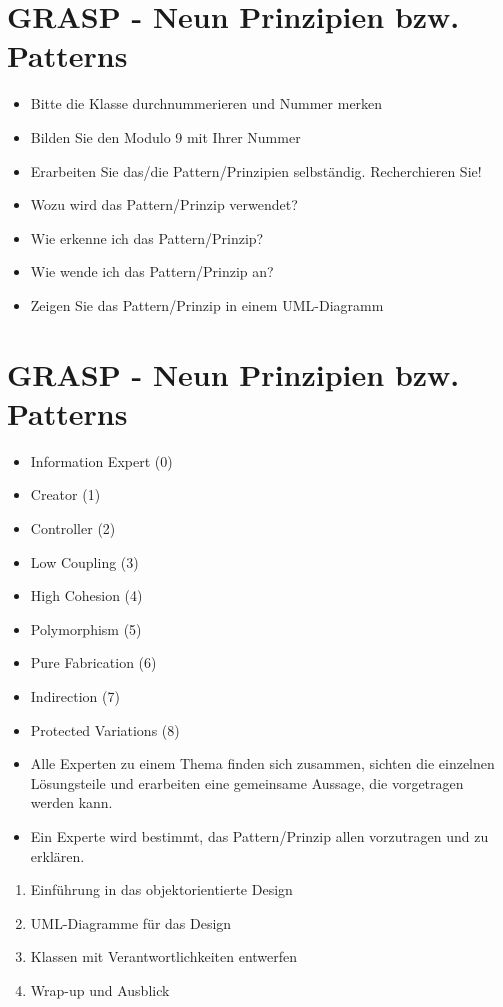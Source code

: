 \documentclass[10pt]{article}
\begin{document}
\section*{GRASP - Neun Prinzipien bzw. Patterns}
\begin{itemize}
  \item Bitte die Klasse durchnummerieren und Nummer merken
  \item Bilden Sie den Modulo 9 mit Ihrer Nummer
  \item Erarbeiten Sie das/die Pattern/Prinzipien selbständig. Recherchieren Sie!
  \item Wozu wird das Pattern/Prinzip verwendet?
  \item Wie erkenne ich das Pattern/Prinzip?
  \item Wie wende ich das Pattern/Prinzip an?
  \item Zeigen Sie das Pattern/Prinzip in einem UML-Diagramm
\end{itemize}

\section*{GRASP - Neun Prinzipien bzw. Patterns}
\begin{itemize}
  \item Information Expert (0)
  \item Creator (1)
  \item Controller (2)
  \item Low Coupling (3)
  \item High Cohesion (4)
  \item Polymorphism (5)
  \item Pure Fabrication (6)
  \item Indirection (7)
  \item Protected Variations (8)
  \item Alle Experten zu einem Thema finden sich zusammen, sichten die einzelnen Lösungsteile und erarbeiten eine gemeinsame Aussage, die vorgetragen werden kann.
  \item Ein Experte wird bestimmt, das Pattern/Prinzip allen vorzutragen und zu erklären.
\end{itemize}

\begin{enumerate}
  \item Einführung in das objektorientierte Design
  \item UML-Diagramme für das Design
  \item Klassen mit Verantwortlichkeiten entwerfen
  \item Wrap-up und Ausblick
\end{enumerate}
\end{document}

